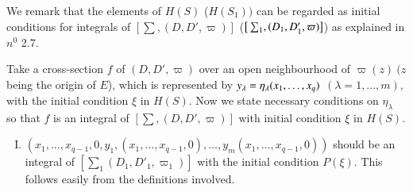We remark that the elements of $H(S)$ (\resp  $H(S_1))$ can be regar\-ded
as initial conditions for integrals of $\left [\sum,  (D,  D',  \varpi
  ) \right]$ (\resp  $\big[ \sum_1,  (D_1,\break  D'_1 ,  \varpi) \big]$) as explained in $n^0$ 2.7. 

Take a cross-section $f$ of $(D,  D',  \varpi)$ over an open
neighbourhood of $\varpi (z) ~ (z$  being the origin of $E$),  which
is represented by $y_ \lambda = \eta_\lambda (x_1,  \ldots ,\break  x_q)$
$(\lambda = 1,  \ldots ,  m)$,  with the initial condition $\xi$ in
$H(S)$. Now we state necessary conditions on $\eta_ \lambda$ so that
$f$ is an integral of $\left [ \sum,  (D,  D',  \varpi ) \right ]$
with initial condition $\xi$ in $H(S)$. 

\begin{enumerate} [I.]
\item $(x_1,  \ldots ,  x_{q-1} ,  0 ,  y_1 ,  (x_1,  \ldots ,
  x_{q-1} ,  0),  \ldots ,  y_m (x_1,  \ldots ,  x_{q-1} ,  0))$\hfill\break
  should be an integral of $\left [\sum_1 (D_1,  D'_1, \varpi_1 ) \right
  ]$ with the initial condition $P(\xi)$. This follows easily from the
  definitions involved. 


\end{enumerate}
